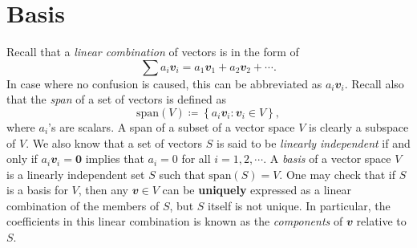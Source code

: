 \documentclass[math, code]{amznotes}
\theoremstyle{remark}
\newcommand{\zero}{\mathbf{0}}
\begin{document}
\section{Basis}
Recall that a \textit{linear combination} of vectors is in the form of
\begin{equation*}
    \sum a_i\mathbfit{v}_i = a_1\mathbfit{v}_1 + a_2\mathbfit{v}_2 + \cdots.
\end{equation*}
In case where no confusion is caused, this can be abbreviated as $a_i\mathbfit{v}_i$. Recall also that the \textit{span} of a set of vectors is defined as
\begin{equation*}
    \mathrm{span}(V) \coloneqq \left\{a_i\mathbfit{v}_i \colon \mathbfit{v}_i \in V\right\},
\end{equation*}
where $a_i$'s are scalars. A span of a subset of a vector space $V$ is clearly a subspace of $V$. We also know that a set of vectors $S$ is said to be \textit{linearly independent} if and only if  $a_i\mathbfit{v}_i = \zero$ implies that $a_i = 0$ for all $i = 1, 2, \cdots$. A \textit{basis} of a vector space $V$ is a linearly independent set $S$ such that $\mathrm{span}(S) = V$. One may check that if $S$ is a basis for $V$, then any $\mathbfit{v} \in V$ can be \textbf{uniquely} expressed as a linear combination of the members of $S$, but $S$ itself is not unique. In particular, the coefficients in this linear combination is known as the \textit{components} of $\mathbfit{v}$ relative to $S$.
\end{document}
